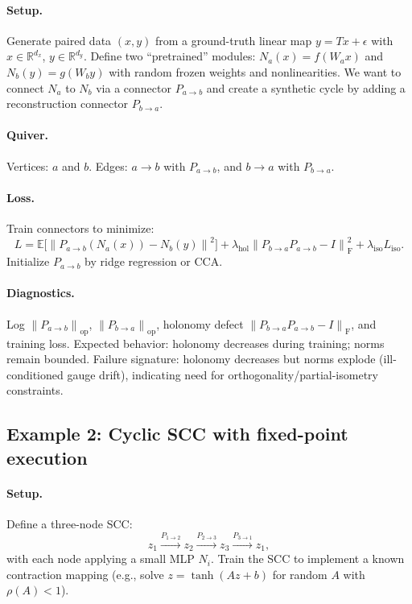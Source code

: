 \documentclass[11pt]{article}
\theoremstyle{definition}
\theoremstyle{plain}
\theoremstyle{remark}
\newcommand{\R}{\mathbb{R}}
\newcommand{\E}{\mathbb{E}}
\newcommand{\norm}[1]{\left\lVert #1 \right\rVert}
\newcommand{\opnorm}[1]{\left\lVert #1 \right\rVert_{\mathrm{op}}}
\newcommand{\Frob}[1]{\left\lVert #1 \right\rVert_{\mathrm{F}}}
\begin{document}
\paragraph{Setup.}
Generate paired data $(x,y)$ from a ground-truth linear map $y=Tx+\epsilon$ with $x\in\R^{d_x}$, $y\in\R^{d_y}$.
Define two ``pretrained'' modules:
$N_a(x)=f(W_a x)$ and $N_b(y)=g(W_b y)$ with random frozen weights and nonlinearities.
We want to connect $N_a$ to $N_b$ via a connector $P_{a\to b}$ and create a synthetic cycle by adding a reconstruction connector $P_{b\to a}$.

\paragraph{Quiver.}
Vertices: $a$ and $b$.
Edges: $a\to b$ with $P_{a\to b}$, and $b\to a$ with $P_{b\to a}$.

\paragraph{Loss.}
Train connectors to minimize:
\[
L = \E\big[\norm{P_{a\to b}(N_a(x)) - N_b(y)}^2\big]
+ \lambda_{\mathrm{hol}} \Frob{P_{b\to a}P_{a\to b}-I}^2
+ \lambda_{\mathrm{iso}} L_{\mathrm{iso}}.
\]
Initialize $P_{a\to b}$ by ridge regression or CCA.

\paragraph{Diagnostics.}
Log $\opnorm{P_{a\to b}}$, $\opnorm{P_{b\to a}}$, holonomy defect $\Frob{P_{b\to a}P_{a\to b}-I}$, and training loss.
Expected behavior: holonomy decreases during training; norms remain bounded.
Failure signature: holonomy decreases but norms explode (ill-conditioned gauge drift), indicating need for orthogonality/partial-isometry constraints.

\subsection{Example 2: Cyclic SCC with fixed-point execution}
\paragraph{Setup.}
Define a three-node SCC:
\[
z_1 \xrightarrow{P_{1\to 2}} z_2 \xrightarrow{P_{2\to 3}} z_3 \xrightarrow{P_{3\to 1}} z_1,
\]
with each node applying a small MLP $N_i$.
Train the SCC to implement a known contraction mapping (e.g., solve $z=\tanh(Az+b)$ for random $A$ with $\rho(A)<1$).
\end{document}
